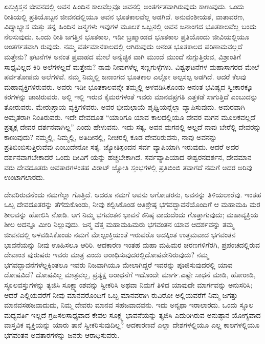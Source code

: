 ಏಸುಕ್ರಿಸ್ತನ ಜೀವನದಲ್ಲಿ ಅವನ ಹಿಂದಿನ ಕಾಲವೆಲ್ಲವೂ ಅವನಲ್ಲಿ ಅಂತರ್ಗತವಾಗಿರುವುದು ಕಾಣುವುದು. ಒಂದು ರೀತಿಯಲ್ಲಿ ಪ್ರತಿಯೊಬ್ಬನ ಜೀವನದಲ್ಲಿಯೂ ಅವನ ಭೂತಕಾಲವೆಲ್ಲ ಅಡಗಿದೆ. ಅನುವಂಶೀಯತೆ, ವಾತಾವರಣ, ವಿದ್ಯಾಭ್ಯಾಸ ಮತ್ತು ತನ್ನ ಹಿಂದಿನ ಜನ್ಮಗಳು ಇವುಗಳ ಮೂಲಕ ಒಬ್ಬನಲ್ಲಿ ಅವನ ಜನಾಂಗದ ಭೂತಕಾಲವೆಲ್ಲ ಬಂದು ನೆಲಸುವುದು. ಒಂದು ರೀತಿ ಜಗತ್ತಿನ ಭೂತಕಾಲ, ಇಡೀ ಬ್ರಹ್ಮಾಂಡದ ಭೂತಕಾಲ ಪ್ರತಿಯೊಂದು ಜೀವಿಯಲ್ಲಿಯೂ ಅಂತರ್ಗತವಾಗಿ ರುವುದು. ನಮ್ಮ ವರ್ತಮಾನಕಾಲದಲ್ಲಿ ಆಗಿರುವುದು ಅನಂತ ಭೂತಕಾಲದ ಪರಿಣಾಮವಲ್ಲದೆ ಮತ್ತೇನು? ಘಟನೆಗಳ ಅನಂತ ಪ್ರವಾಹದ ಮೇಲೆ ಅನೈಚ್ಛಿಕ ವಾಗಿ ಮುಂದೆ ಮುಂದೆ ನುಗ್ಗುತ್ತಿರುವ, ವಿಶ್ರಾಂತಿಗೆ ಸಾಧ್ಯವಿಲ್ಲದ ಕಿರಿ ಅಲೆಗಳಲ್ಲದೆ ಮತ್ತೇನು? ನಾವು ನೀವುಗಳೆಲ್ಲ ಸಣ್ಣಗುಳ್ಳೆಗಳು. ವಿಶ್ವಘಟನೆಗಳ ಮಹಾಸಾಗರದ ಮೇಲೆ ಪರ್ವತೋಪಮ ಅಲೆಗಳಿವೆ. ನಮ್ಮ ನಿಮ್ಮಲ್ಲಿ ಜನಾಂಗದ ಭೂತಕಾಲ ಎಲ್ಲೋ ಅಲ್ಪಸಲ್ಪ ಅಡಗಿದೆ. ಆದರೆ ಕೆಲವು ಮಹಾವ್ಯಕ್ತಿಗಳಿರುವರು. ಅವರು ಇಡೀ ಭೂತಕಾಲವನ್ನೇ ತಮ್ಮಲ್ಲಿ ಅಳವಡಿಸಿಕೊಂಡು ಅನಂತ ಭವಿಷ್ಯದ ಸ್ವೀಕಾರಕ್ಕೂ ಕರಗಳನ್ನು ಚಾಚಿರುವರು. ಅಲ್ಲಿ ಇಲ್ಲಿ ಇರುವ ಕೈಮರಗಳಂತೆ ಇವರು ಮಾನವಪ್ರಗತಿ ಎತ್ತಕಡೆ ಸಾಗುತ್ತಿದೆ ಎಂಬುದನ್ನು ತೋರುವರು. ಮೇರುಪ್ರಾಯ ವ್ಯಕ್ತಿಗಳಿವರು. ಅವರ ಭೀಮಛಾಯೆ ಪೃಥ್ವಿಯನ್ನೆಲ್ಲಾ ವ್ಯಾಪಿಸುವುದು. ಅಮರವಾಗಿ ಅಮೃತರಾಗಿ ನಿಂತಿರುವರು. ಇದೇ ದೇವದೂತ “ಯಾರಿಗೂ ಯಾವ ಕಾಲದಲ್ಲಿಯೂ ದೇವರ ಮಗನ ಮೂಲಕವಲ್ಲದೆ ಪ್ರತ್ಯಕ್ಷ ದೇವರ ದರ್ಶನವಾಗಿಲ್ಲ” ಎಂದು ಹೇಳುವನು. ಇದು ಸತ್ಯ. ಅವನ ಮಗನಲ್ಲಿ ಅಲ್ಲದೆ ನಾವು ಬೇರೆಲ್ಲಿ ದೇವರನ್ನು ಕಾಣುವುದು? ನಮ್ಮಲ್ಲಿ, ನಿಮ್ಮಲ್ಲಿ, ಅತಿದೀನಲ್ಲಿ, ನೀಚರಲ್ಲಿ ಕೂಡ ದೇವರಿರುವನು, ನಾವು ಅವನನ್ನು ಪ್ರತಿಬಿಂಬಿಸುತ್ತಿರುವೆವು ಎಂಬುದೇನೋ ಸತ್ಯ. ಜ್ಯೋತಿಸ್ಪಂದನ ಸರ್ವ ವ್ಯಾಪಿಯಾಗಿ ಇರುವುದು. ಆದರೆ ಅದರ ದರ್ಶನವಾಗಬೇಕಾದರೆ ಒಂದು ದೀವಿಗೆ ಯನ್ನು ಹಚ್ಚಬೇಕಾಗಿದೆ. ಸರ್ವವ್ಯಾಪಿಯಾದ ಈಶ್ವರನದರ್ಶನ, ದೇವಮಾನ ವರು ದೇವದೂತರು ಅವತಾರಗಳಂತಹ ವಿರಾಟ್​ ಜ್ಯೋತಿ ಸ್ತಂಭಗಳಲ್ಲಿ ಪ್ರತಿಬಿಂಬಿ ತವಾಗದೆ ನಮಗೆ ಅದರ ಅರಿವು ಉಂಟಾಗಲಾರದು.

ದೇವರಿರುವನೆಂದು ನಮಗೆಲ್ಲಾ ಗೊತ್ತಿದೆ. ಆದರೂ ನಮಗೆ ಅವನು ಅಗೋಚರನು, ಅವನನ್ನು ತಿಳಿಯಲಾರೆವು. ಇಂತಹ ಒಬ್ಬ ದೇವದೂತರನ್ನು ತೆಗೆದುಕೊಂಡು, ನೀವು ಕಲ್ಪಿಸಿಕೊಂಡ ಅತಿಶ್ರೇಷ್ಠ ಭಗವದ್ಭಾವನೆಯೊಂದಿಗೆ ಆ ಮಹಾಮಹಿ ಮರ ಶೀಲವನ್ನು ಹೋಲಿಸಿ ನೋಡಿ. ಆಗ ನಿಮ್ಮ ಭಗವಂತನ ಭಾವನೆ ಕನಿಷ್ಠ ವಾದುದೆಂದು ಗೊತ್ತಾಗುವುದು; ಮಹಾವ್ಯಕ್ತಿಯ ಶೀಲ ಅದನ್ನೂ ಮೀರಿ ನಿಲ್ಲುವುದು. ಜನ್ಮ ವೆತ್ತ ಮಹಾಮಹಿಮರು ಭಗವಂತನ ಯಾವ ಆದರ್ಶವನ್ನು ತಮ್ಮ ಜೀವನದಲ್ಲಿ ಅಳವಡಿಸಿಕೊಂಡು ನಮಗೆ ಮೇಲ್ಪಂಕ್ತಿಯಂತೆ ಇರುವರೊ ಅದಕ್ಕಿಂತ ಉತ್ತಮವಾದ ಭಗವಂತನ ಭಾವನೆಯನ್ನು ನೀವು ಊಹಿಸಲೂ ಆರಿರಿ. ಆದಕಾರಣ ಇಂತಹ ಮಹಾ ಮಹಿಮರ ಚರಣಗಳಿಗೆರಗಿ, ಪ್ರಪಂಚದಲ್ಲಿರುವ ದೇವಾಂಶ ಪುರುಷರು ಇವರು ಮಾತ್ರ ಎಂದು ಆರಾಧಿಸುವುದರಲ್ಲಿ\break ದೋಷವೇನಿರುವುದು? ನಮ್ಮ ಭಗವದ್ಭಾವನೆಗಳೆಲ್ಲಕ್ಕಿಂತಲೂ ಇವರು ನಿಜವಾಗಿಯೂ ಮೇಲಾಗಿದ್ದರೆ ಇವರನ್ನು ಪೂಜಿಸುವುದರಲ್ಲಿ ಯಾವ ದೋಷವಿದೆ? ದೋಷವಿಲ್ಲ ಮಾತ್ರವಲ್ಲ, ಪ್ರತ್ಯಕ್ಷ ಆರಾಧನೆಗೆ ಇದೊಂದೇ ಮಾರ್ಗ.ಎಷ್ಟೇ ಸಾಧನೆ ಮಾಡಿ, ಹೋರಾಡಿ, ಸ್ಥೂಲವಸ್ತುಗಳನ್ನು ತ್ಯಜಿಸಿ ಸೂಕ್ಷ್ಮಾಂಶವನ್ನು ಸ್ವೀಕರಿಸಿ ಅಥವಾ ನಿಮಗೆ ತಿಳಿದ ಯಾವುದೇ ಮಾರ್ಗವನ್ನು ಅನುಸರಿಸಿ; ಆದರೆ ಎಲ್ಲಿಯವರೆಗೆ ನೀವು ಮಾನವರೊಂದಿಗೆ ಒಬ್ಬ ಮಾನವರಾಗಿ ರುವಿರೋ ಅಲ್ಲಿಯವರೆಗೆ ನಿಮ್ಮ ಜಗತ್ತು ಮಾನವಸಹಜವಾದುದು, ನಿಮ್ಮ ದೇವರು ಮಾನವ ಸಹಜವಾದವನು. ಇದು ಅನ್ಯಥಾ ಇರಾಲಾರದು. ಒಂದು ಸ್ಥೂಲ ಮಧ್ಯವರ್ತಿ ಇಲ್ಲದೆ ಗ್ರಹಿಸಲಸಾಧ್ಯವಾದ ಕೇವಲ ಸೂಕ್ಷ್ಮ ಭಾವನೆಯನ್ನು ತ್ಯಜಿಸಿ ಎದುರಿಗಿರುವ ಅನುಷ್ಠಾನ ಯೋಗ್ಯವಾದ ವಾಸ್ತವಿಕ ವ್ಯಕ್ತಿಯನ್ನು ಯಾರು ತಾನೆ ಸ್ವೀಕರಿಸುವುದಿಲ್ಲ? ಆದಕಾರಣವೆ ಎಲ್ಲಾ ದೇಶಗಳಲ್ಲಿಯೂ ಎಲ್ಲ ಕಾಲಗಳಲ್ಲಿಯೂ ಭಗವಂತನ ಅವತಾರಗಳನ್ನು ಜನರು ಆರಾಧಿಸುವರು.

